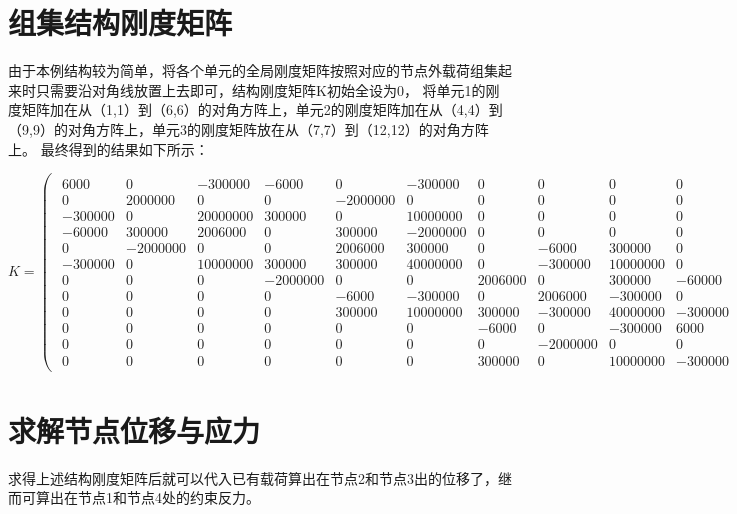 \documentclass[UTF8]{ctexart}
\begin{document}
\section{组集结构刚度矩阵}

由于本例结构较为简单，将各个单元的全局刚度矩阵按照对应的节点外载荷组集起来时只需要沿对角线放置上去即可，结构刚度矩阵K初始全设为0，
将单元1的刚度矩阵加在从（1,1）到（6,6）的对角方阵上，单元2的刚度矩阵加在从（4,4）到（9,9）的对角方阵上，单元3的刚度矩阵放在从（7,7）到（12,12）的对角方阵上。
最终得到的结果如下所示：

\[ K= \begin{pmatrix}
\begin{smallmatrix}
6000 & 0 & -300000 & -6000 & 0 & -300000 & 0 & 0 & 0 & 0 & 0 & 0 \\
0 & 2000000 & 0 & 0 & -2000000 & 0 & 0 & 0 & 0 & 0 & 0 & 0 \\
-300000 & 0 & 20000000 & 300000 & 0 & 10000000 & 0 & 0 & 0 & 0 & 0 & 0 \\
-6000 0 & 300000 & 2006000 & 0 & 300000 & -2000000 & 0 & 0 & 0 & 0 & 0 \\
0 & -2000000 & 0 & 0 & 2006000 & 300000 & 0 & -6000 & 300000 & 0 & 0 & 0 \\
-300000 & 0 & 10000000 & 300000 & 300000 & 40000000 & 0 & -300000 & 10000000 & 0 & 0 & 0 \\
0 & 0 & 0 & -2000000 & 0 & 0 & 2006000 & 0 & 300000 & -6000 0 & 300000 \\
0 & 0 & 0 & 0 & -6000 &-300000 & 0 & 2006000 & -300000 & 0 & -2000000 & 0 \\
0 & 0 & 0 & 0 & 300000 & 10000000 & 300000 & -300000 & 40000000 & -300000 & 0 & 10000000 \\
0 & 0 & 0 & 0 & 0 & 0 & -6000 & 0 &-300000 &6000 & 0 &-300000 \\
0 & 0 & 0 & 0 & 0 & 0 & 0 & -2000000 & 0 & 0 & 2000000 & 0 \\
0 & 0 & 0 & 0 & 0 & 0 & 300000 & 0 & 10000000 & -300000 & 0 & 20000000
\end{smallmatrix}
\end{pmatrix} \]

\section{求解节点位移与应力}

求得上述结构刚度矩阵后就可以代入已有载荷算出在节点2和节点3出的位移了，继而可算出在节点1和节点4处的约束反力。

\smallskip
\end{document}
